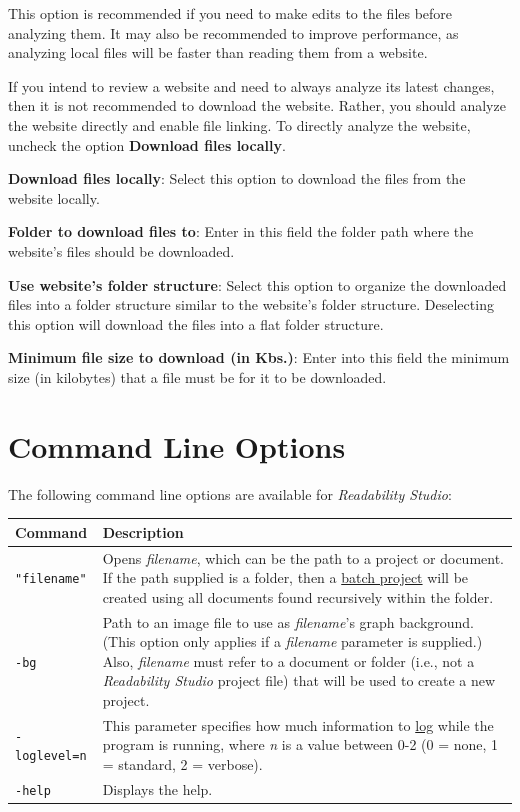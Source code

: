 \documentclass[
]{book}
\theoremstyle{definition}
\theoremstyle{definition}
\theoremstyle{definition}
\theoremstyle{definition}
\theoremstyle{remark}
\begin{document}
This option is recommended if you need to make edits to the files before analyzing them. It may also be recommended to improve performance, as analyzing local files will be faster than reading them from a website.

If you intend to review a website and need to always analyze its latest changes, then it is not recommended to download the website. Rather, you should analyze the website directly and enable file linking. To directly analyze the website, uncheck the option \textbf{Download files locally}.

\textbf{Download files locally}: Select this option to download the files from the website locally.

\textbf{Folder to download files to}: Enter in this field the folder path where the website's files should be downloaded.

\textbf{Use website's folder structure}: Select this option to organize the downloaded files into a folder structure similar to the website's folder structure. Deselecting this option will download the files into a flat folder structure.

\textbf{Minimum file size to download (in Kbs.)}: Enter into this field the minimum size (in kilobytes) that a file must be for it to be downloaded.

\hypertarget{command-line-options}{%
\section{Command Line Options}\label{command-line-options}}

The following command line options are available for \emph{Readability Studio}:

\begin{longtable}[]{@{}
  >{\raggedright\arraybackslash}p{}
  >{\raggedright\arraybackslash}p{}@{}}
\toprule
Command & Description \\
\midrule
\endhead
\texttt{"filename"} & Opens \emph{filename}, which can be the path to a project or document. If the path supplied is a folder, then a \protect\hyperlink{creating-batch-project}{batch project} will be created using all documents found recursively within the folder. \\
\texttt{-bg} & Path to an image file to use as \emph{filename}'s graph background. (This option only applies if a \emph{filename} parameter is supplied.) Also, \emph{filename} must refer to a document or folder (i.e., not a \emph{Readability Studio} project file) that will be used to create a new project. \\
\texttt{-loglevel=n} & This parameter specifies how much information to \protect\hyperlink{log-report}{log} while the program is running, where \emph{n} is a value between 0-2 (0 = none, 1 = standard, 2 = verbose). \\
\texttt{-help} & Displays the help. \\
\bottomrule
\end{longtable}
\end{document}
